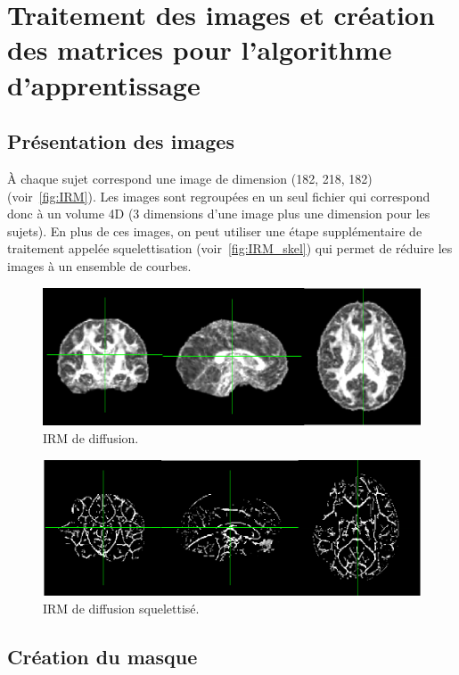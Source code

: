 \section{Traitement des images et création des matrices pour l'algorithme d'apprentissage}

\subsection{Présentation des images}

À chaque sujet correspond une image de dimension (182, 218, 182) (voir~\autoref{fig:IRM}).
Les images sont regroupées en un seul fichier qui correspond donc à un volume 4D (3 dimensions d'une image plus une dimension pour les sujets).
En plus de ces images, on peut utiliser une étape supplémentaire de traitement appelée squelettisation (voir~\autoref{fig:IRM_skel}) qui permet de réduire les images à un ensemble de courbes.

\begin{figure}[htpb]
	\centering
	\includegraphics[scale = 0.5]{images/example_dwi}
	\caption{IRM de diffusion.}
	\label{fig:IRM}
\end{figure}

\begin{figure}[htpb]
	\centering
	\includegraphics[scale = 0.5]{images/example_dwi_skel}
	\caption{IRM de diffusion squelettisé.}
	\label{fig:IRM_skel}
\end{figure}


\subsection{Création du masque}

